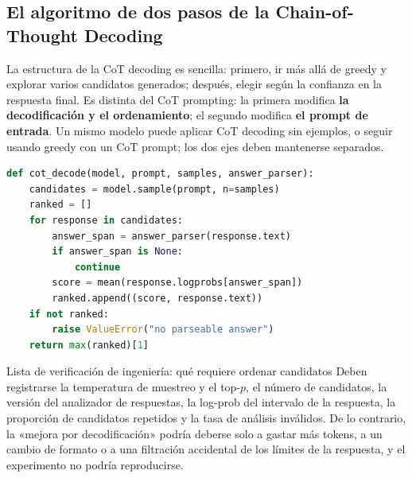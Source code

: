 \subsection{El algoritmo de dos pasos de la Chain-of-Thought Decoding}

La estructura de la CoT decoding es sencilla: primero, ir más allá de greedy y explorar varios candidatos generados; después, elegir según la confianza en la respuesta final. Es distinta del CoT prompting: la primera modifica \textbf{la decodificación y el ordenamiento}; el segundo modifica \textbf{el prompt de entrada}. Un mismo modelo puede aplicar CoT decoding sin ejemplos, o seguir usando greedy con un CoT prompt; los dos ejes deben mantenerse separados.


\begin{lstlisting}[language=Python,caption={Pseudocódigo mínimo para reordenar candidatos CoT según la confianza en la respuesta}]
def cot_decode(model, prompt, samples, answer_parser):
    candidates = model.sample(prompt, n=samples)
    ranked = []
    for response in candidates:
        answer_span = answer_parser(response.text)
        if answer_span is None:
            continue
        score = mean(response.logprobs[answer_span])
        ranked.append((score, response.text))
    if not ranked:
        raise ValueError("no parseable answer")
    return max(ranked)[1]
\end{lstlisting}

\begin{knowledgebox}{Lista de verificación de ingeniería: qué requiere ordenar candidatos}
Deben registrarse la temperatura de muestreo y el top-$p$, el número de candidatos, la versión del analizador de respuestas, la log-prob del intervalo de la respuesta, la proporción de candidatos repetidos y la tasa de análisis inválidos. De lo contrario, la «mejora por decodificación» podría deberse solo a gastar más tokens, a un cambio de formato o a una filtración accidental de los límites de la respuesta, y el experimento no podría reproducirse.
\end{knowledgebox}


